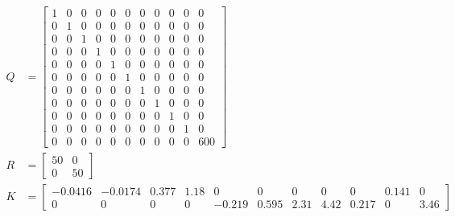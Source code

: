 \documentclass{sydeStyle}
\begin{document}
\setcounter{MaxMatrixCols}{20}
\begin{align*}
    Q &=
    \begin{bmatrix}
        1 & 0 & 0 & 0 & 0 & 0 & 0 & 0 & 0 & 0 & 0 \\
        0 & 1 & 0 & 0 & 0 & 0 & 0 & 0 & 0 & 0 & 0 \\
        0 & 0 & 1 & 0 & 0 & 0 & 0 & 0 & 0 & 0 & 0 \\
        0 & 0 & 0 & 1 & 0 & 0 & 0 & 0 & 0 & 0 & 0 \\
        0 & 0 & 0 & 0 & 1 & 0 & 0 & 0 & 0 & 0 & 0 \\
        0 & 0 & 0 & 0 & 0 & 1 & 0 & 0 & 0 & 0 & 0 \\
        0 & 0 & 0 & 0 & 0 & 0 & 1 & 0 & 0 & 0 & 0 \\
        0 & 0 & 0 & 0 & 0 & 0 & 0 & 1 & 0 & 0 & 0 \\
        0 & 0 & 0 & 0 & 0 & 0 & 0 & 0 & 1 & 0 & 0 \\
        0 & 0 & 0 & 0 & 0 & 0 & 0 & 0 & 0 & 1 & 0 \\
        0 & 0 & 0 & 0 & 0 & 0 & 0 & 0 & 0 & 0 & 600
    \end{bmatrix}
    \\
    R &=
    \begin{bmatrix}
        50 & 0 \\
        0 & 50
    \end{bmatrix}
    \\
    K &=
    \begin{bmatrix}
        -0.0416 & -0.0174 & 0.377 & 1.18 & 0 & 0 & 0 & 0 & 0 & 0.141 & 0 \\
        0 & 0 & 0 & 0 & -0.219 & 0.595 & 2.31 & 4.42 & 0.217 & 0 & 3.46
    \end{bmatrix}
\end{align*}

\printglossary[type=symbol]


\end{document}
